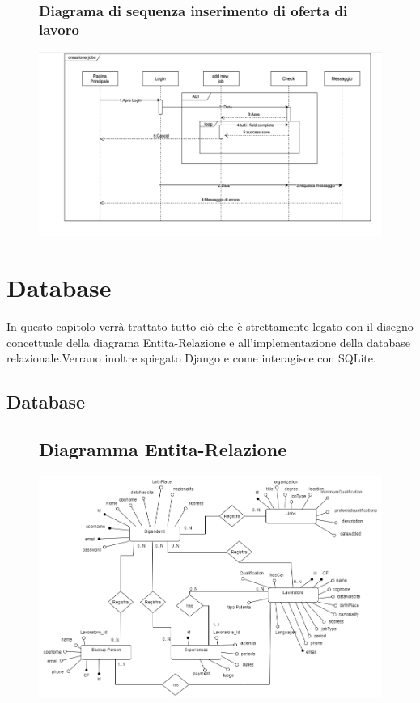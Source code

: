 \documentclass[ 4paper,11pt,openany]{book}
\begin{document}
\begin{figure}[htpb!] 
	\subsection{Diagrama di sequenza inserimento di oferta di lavoro}
	\includegraphics[width=180mm]{creazione_Job.jpeg}
\end{figure}



\chapter{Database}
In questo capitolo verrà trattato tutto ciò che è strettamente legato con il disegno concettuale della diagrama Entita-Relazione e all'implementazione della database relazionale.Verrano inoltre spiegato Django e come interagisce con SQLite.
\section{Database}
\begin{figure}[htpb!] 
	\section{Diagramma Entita-Relazione} 
	\includegraphics[width=185mm]{Database.png}
\end{figure}
\end{document}
